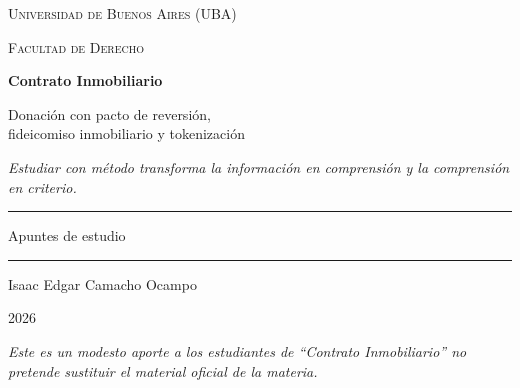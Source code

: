 \documentclass[12pt,oneside]{book}
\newcommand{\universidad}{Universidad de Buenos Aires (UBA)}
\newcommand{\facultad}{Facultad de Derecho}
\newcommand{\materia}{Contrato Inmobiliario}
\newcommand{\titulo}{Donación con pacto de reversión,\\ fideicomiso inmobiliario y tokenización}
\newcommand{\autor}{Isaac Edgar Camacho Ocampo}
\newcommand{\anio}{2026}
\begin{document}
\begin{titlepage}

\thispagestyle{empty}

\begin{center}

\vspace*{1cm}

{\large \textsc{\universidad}}

\vspace{0.2cm}

{\large \textsc{\facultad}}

\vspace{3cm}

{\Huge \textbf{\materia}}

\vspace{1cm}

{\LARGE \titulo}

\vspace{0.8cm}

\textit{Estudiar con método transforma la información en comprensión y la comprensión en criterio.}

\vspace{1.2cm}

\rule{0.70\textwidth}{0.5pt}

\vspace{0.5cm}

{\large Apuntes de estudio}

\vspace{0.5cm}

\rule{0.70\textwidth}{0.5pt}

\vfill

{\large \autor}

\vspace{0.3cm}

{\large \anio}

\end{center}

\vfill

\begin{flushleft}
\textit{Este es un modesto aporte a los estudiantes de ``Contrato Inmobiliario'' no pretende sustituir el material oficial de la materia.}
\end{flushleft}

\end{titlepage}

\tableofcontents
\clearpage
\end{document}
